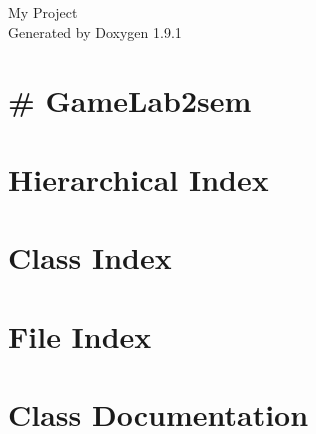 \let\mypdfximage\pdfximage\def\pdfximage{\immediate\mypdfximage}\documentclass[twoside]{book}
\newcommand{\+}{\discretionary{\mbox{\scriptsize$\hookleftarrow$}}{}{}}
\newcommand{\clearemptydoublepage}{%
  \newpage{\pagestyle{empty}\cleardoublepage}%
}
\begin{document}
\raggedbottom

\hypersetup{pageanchor=false,
             bookmarksnumbered=true,
             pdfencoding=unicode
            }
\begin{titlepage}
\vspace*{7cm}
\begin{center}%
{\Large My Project }\\
\vspace*{1cm}
{\large Generated by Doxygen 1.9.1}\\
\end{center}
\end{titlepage}
\clearemptydoublepage
{}
\tableofcontents
\clearemptydoublepage
{}
\hypersetup{pageanchor=true}

\chapter{\# Game\+Lab2sem}
\label{md_README}

\chapter{Hierarchical Index}

\chapter{Class Index}

\chapter{File Index}

\chapter{Class Documentation}



























\end{document}
